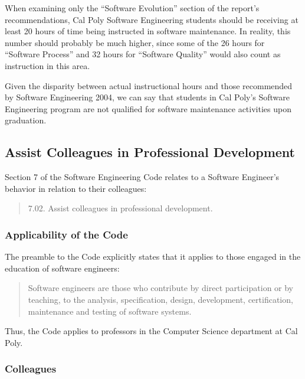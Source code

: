 \documentclass[11pt]{article}
\begin{document}
\begin{multicols}{2}
When examining only the ``Software Evolution'' section of the report's recommendations, Cal Poly Software Engineering students should be receiving at least 20 hours of time being instructed in software maintenance.  In reality, this number should probably be much higher, since some of the 26 hours for ``Software Process'' and 32 hours for ``Software Quality'' would also count as instruction in this area.

Given the disparity between actual instructional hours and those recommended by Software Engineering 2004, we can say that students in Cal Poly's Software Engineering program are not qualified for software maintenance activities upon graduation.


\subsection{Assist Colleagues in Professional Development}

Section 7 of the Software Engineering Code relates to a Software Engineer's behavior in relation to their colleagues:

\begin{quote}
7.02. Assist colleagues in professional development.\cite{secode}
\end{quote}

\subsubsection{Applicability of the Code}

The preamble to the Code explicitly states that it applies to those engaged in the education of software engineers:

\begin{quote}
Software engineers are those who contribute by direct participation or by teaching, to the analysis, specification, design, development, certification, maintenance and testing of software systems. \cite{secode}
\end{quote}

Thus, the Code applies to professors in the Computer Science department at Cal Poly.

\subsubsection{Colleagues}


\end{multicols}
\end{document}
